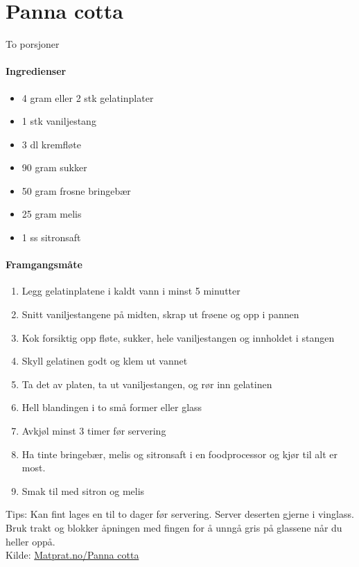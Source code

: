 \section{﻿Panna cotta}
\label{pannacotta}
To porsjoner

\paragraph{Ingredienser}
\begin{itemize}[noitemsep]
	\item 4 gram eller 2 stk gelatinplater
	\item 1 stk vaniljestang
	\item 3 dl kremfløte %
	\item 90 gram sukker
	\item 50 gram frosne bringebær
	\item 25 gram melis
	\item 1 ss sitronsaft
\end{itemize}

\paragraph{Framgangsmåte}
\begin{enumerate}[noitemsep]
	\item Legg gelatinplatene i kaldt vann i minst 5 minutter
	\item Snitt vaniljestangene på midten, skrap ut frøene og opp i pannen
	\item Kok forsiktig opp fløte, sukker, hele vaniljestangen og innholdet i stangen
	\item Skyll gelatinen godt og klem ut vannet
	\item Ta det av platen, ta ut vaniljestangen, og rør inn gelatinen
	\item Hell blandingen i to små former eller glass
	\item Avkjøl minst 3 timer før servering
	\item Ha tinte bringebær, melis og sitronsaft i en foodprocessor og kjør til alt er most.
	\item Smak til med sitron og melis
\end{enumerate}


Tips: Kan fint lages en til to dager før servering. Server deserten gjerne i vinglass. Bruk trakt og blokker åpningen med fingen for å unngå gris på glassene når du heller oppå.\\

Kilde: \href{http://www.matprat.no/gjester/gjesteoppskrifter/panna-cotta/}{Matprat.no/Panna cotta}
